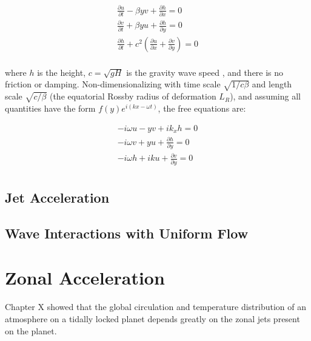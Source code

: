 \begin{equation}\label{eqn:sw-eqns-1}
  \begin{gathered}
     \frac{\partial u}{\partial t} - \beta y v +\frac{\partial h}{\partial x} = 0 \\
      \frac{\partial v}{\partial t} + \beta y u + \frac{\partial h}{\partial y} = 0 \\
    \frac{\partial h}{\partial t} +c^{2}(\frac{\partial u}{\partial x} + \frac{\partial v}{\partial y}) = 0 \\
  \end{gathered}
\end{equation}

where $h$ is the height, $c = \sqrt{gH}$ is the gravity wave speed \citep{matsuno1966quasi}, and there is no friction or damping. Non-dimensionalizing with time scale $\sqrt{1/c \beta}$ and length scale $\sqrt{c/\beta}$ (the equatorial Rossby radius of deformation $L_{R}$), and assuming all quantities have the form $f(y) e^{i( k x-\omega t)}$, the free equations are:

\begin{equation}\label{eqn:sw-eqns-2}
  \begin{gathered}
      - i \omega u - y v + i k_{x} h = 0 \\
      - i \omega v + y u + \frac{\partial h}{\partial y} = 0 \\
      - i \omega h + i k u + \frac{\partial v}{\partial y} = 0 \\
  \end{gathered}
\end{equation}

\subsection*{Jet Acceleration}

\subsection*{Wave Interactions with Uniform Flow}


\section{Zonal Acceleration}

Chapter X showed that the global circulation and temperature distribution of an atmosphere on a tidally locked planet depends greatly on the zonal jets present on the planet.



